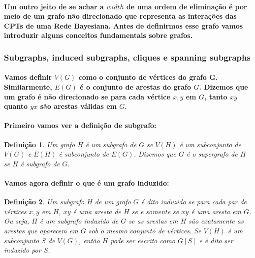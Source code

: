 \documentclass[a4paper,10pt]{article}
\theoremstyle{plain}
\newtheorem*{spn-def}{Definição}
\begin{document}
\paragraph{
  Um outro jeito de se achar a $width$ de uma ordem de eliminação é por meio de um grafo não
  direcionado que representa as interações das CPTs de uma Rede Bayesiana. Antes de definirmos
  esse grafo vamos introduzir alguns conceitos fundamentais sobre grafos.
}

\subsubsection{Subgraphs, induced subgraphs, cliques e spanning subgraphs}

\paragraph{
  Vamos definir $V(G)$ como o conjunto de vértices do grafo G. Similarmente, $E(G)$ é o conjunto de
  arestas do grafo $G$. Dizemos que um grafo é não direcionado se para cada vértice $x, y$ em $G$,
  tanto $xy$ quanto $yx$ são arestas válidas em $G$.
}

\paragraph{
  Primeiro vamos ver a definição de subgrafo:
}

\begin{spn-def} Um grafo $H$ é um subgrafo de $G$ se $V(H)$ é um subconjunto de $V(G)$ e $E(H)$ é
  subconjunto de $E(G)$. Dizemos que $G$ é o supergrafo de $H$ se $H$ é subgrafo de $G$.
\end{spn-def}

\paragraph{
  Vamos agora definir o que é um grafo induzido:
}

\begin{spn-def} Um subgrafo $H$ de um grafo $G$ é dito induzido se para cada par de vértices $x, y$
  em $H$, $xy$ é uma aresta de $H$ se e somente se $xy$ é uma aresta em $G$. Ou seja, $H$ é
  um subgrafo induzido de $G$ se as arestas em $H$ são exatamente as arestas que aparecem em $G$
  sob o mesmo conjunto de vértices. Se $V(H)$ é um subconjunto $S$ de $V(G)$, então $H$ pode ser
  escrito como $G[S]$ e é dito ser induzido por $S$.
\end{spn-def}
\end{document}
